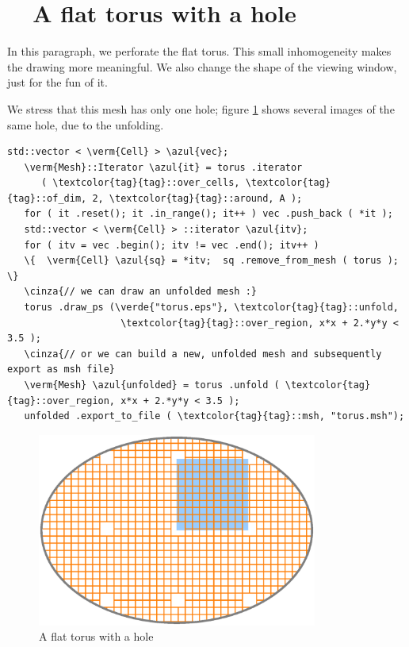 \section{~~A flat torus with a hole}\label{\numb section 7.\numb parag 6}

In this paragraph, we perforate the flat torus.
This small inhomogeneity makes the drawing more meaningful.
We also change the shape of the viewing window, just for the fun of it.

We stress that this mesh has only one hole; figure \ref{\numb section 7.\numb fig 2}
shows several images of the same hole, due to the unfolding.

\begin{Verbatim}[commandchars=\\\{\},formatcom=\small\tt,frame=single,
   label=parag-\ref{\numb section 7.\numb parag 6}.cpp,rulecolor=\color{coment},
   baselinestretch=0.94,framesep=2mm                                            ]
   std::vector < \verm{Cell} > \azul{vec};
   \verm{Mesh}::Iterator \azul{it} = torus .iterator
      ( \textcolor{tag}{tag}::over_cells, \textcolor{tag}{tag}::of_dim, 2, \textcolor{tag}{tag}::around, A );
   for ( it .reset(); it .in_range(); it++ ) vec .push_back ( *it );
   std::vector < \verm{Cell} > ::iterator \azul{itv};
   for ( itv = vec .begin(); itv != vec .end(); itv++ )
   \{  \verm{Cell} \azul{sq} = *itv;  sq .remove_from_mesh ( torus );  \}
   \cinza{// we can draw an unfolded mesh :}
   torus .draw_ps (\verde{"torus.eps"}, \textcolor{tag}{tag}::unfold,
                    \textcolor{tag}{tag}::over_region, x*x + 2.*y*y < 3.5 );
   \cinza{// or we can build a new, unfolded mesh and subsequently export as msh file}
   \verm{Mesh} \azul{unfolded} = torus .unfold ( \textcolor{tag}{tag}::over_region, x*x + 2.*y*y < 3.5 );
   unfolded .export_to_file ( \textcolor{tag}{tag}::msh, "torus.msh");
\end{Verbatim}

\begin{figure}[ht] \centering
  \includegraphics[width=92mm]{flat-torus-2.eps}
  \caption{A flat torus with a hole}
  \label{\numb section 7.\numb fig 2}
\end{figure}

